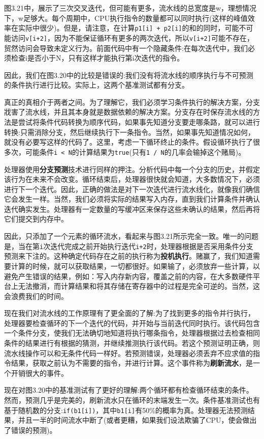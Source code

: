 图3.21中，展示了三次交叉迭代，但可能有更多，流水线的总宽度是w，理想情况下，w足够大。每个周期中，CPU执行指令的数量都可以同时执行(这样的峰值效率在实际中很少)。但是，请注意，在计算\texttt{p1[i] + p2[i]}的和的同时，可能不可能访问\texttt{v[i+2]}，因为不能保证循环有更多的两次迭代，所以\texttt{v[i+2]}可能不存在，贸然访问会导致未定义行为。前面代码中有一个隐藏条件:在每次迭代中，我们必须检查i是否小于N，只有这样才能执行第i次迭代的指令。

因此，我们在图3.20中的比较是错误的:我们没有将流水线的顺序执行与不可预测的条件执行进行比较。实际上，这两个基准测试都有分支。

真正的真相介于两者之间。为了理解它，我们必须学习条件执行的解决方案，分支戕害了流水线，并且其本身就是数据依赖的解决方案。分支存在时保存流水线的方法是尝试将条件代码转换为顺序代码，如果事先知道分支要走哪条路，就可以进行转换:只需消除分支，然后继续执行下一条指令。当然，如果事先知道情况如何，就没有必要写这样的代码了。这里，考虑一下循环终止的条件。假设循环执行了很多次，可能条件\texttt{i < N}的计算结果为\texttt{true}(只有\texttt{1 / N}的几率会输掉这个赌局)。

处理器使用\textbf{分支预测}技术进行同样的押注。分析代码中每一个分支的历史，并假定该行为在未来不会改变。循环结束后，处理器很快就会知道，大多数情况下，必须进行下一个迭代。因此，正确的做法是对下一次迭代进行流水线化，就像我们确信它会发生一样。当然，我们必须将实际的结果写入内存，直到我们计算条件并确认迭代确实发生。处理器有一定数量的写缓冲区来保存这些未确认的结果，然后再将它们提交到内存中。

因此，只添加了一个元素的循环流水，看起来与图3.21所示完全一致。唯一的问题是，当在第\texttt{i}次迭代完成之前开始执行迭代\texttt{i+2}时，处理器根据是否采用条件分支预测来下注的。这种确定代码存在之前的执行称为\textbf{投机执行}。赌赢了，我们知道需要计算的时候，就可以获取结果，一切都很好。如果输了，必须放弃一些计算，以避免产生错误的结果，例如：写入内存新内容，覆盖之前的内容，在大多数硬件平台上无法撤消，而计算结果和将其存储在寄存器中的过程是完全可逆的。当然，这会浪费我们的时间。

现在我们对流水线的工作原理有了更全面的了解:为了找到更多的指令并行执行，处理器要检查循环的下一个迭代的代码，并开始与当前迭代同时执行。该代码包含一个条件分支，使我们无法确切地知道将执行哪条指令，处理器根据过去检查相同条件的结果进行有根据的猜测，并继续推测执行该代码。若这个预测证明正确，则流水线操作可以和无条件代码一样好。若预测错误，处理器必须丢弃不应求值的指令结果，获取之前认为不需要的指令，并进行计算。这个事件称为\textbf{刷新流水}，是一个开销很大的事件。

现在对图3.20中的基准测试有了更好的理解:两个循环都有检查循环结束的条件。然而，预测几乎是完美的，刷新流水只在循环的末端发生一次。条件基准测试也有基于随机数的分支:\texttt{if(b1[i])}，其中\texttt{b1[i]}有50\%的概率为真。处理器无法预测结果，并且一半的时间流水中断了(或者更糟，如果我们设法欺骗了CPU，使会做出了错误的预测)。

